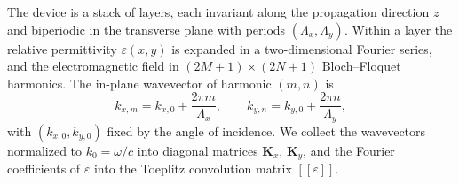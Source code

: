 \documentclass[preprint,12pt]{elsarticle}
\providecommand{\llbracket}{[\![}
\providecommand{\rrbracket}{]\!]}
\begin{document}
The device is a stack of layers, each invariant along the propagation direction
$z$ and biperiodic in the transverse plane with periods $(\Lambda_x,\Lambda_y)$.
Within a layer the relative permittivity $\varepsilon(x,y)$ is expanded in a
two-dimensional Fourier series, and the electromagnetic field in
$(2M{+}1)\times(2N{+}1)$ Bloch--Floquet harmonics. The in-plane wavevector of
harmonic $(m,n)$ is
\begin{equation}
k_{x,m} = k_{x,0} + \frac{2\pi m}{\Lambda_x}, \qquad
k_{y,n} = k_{y,0} + \frac{2\pi n}{\Lambda_y},
\end{equation}
with $(k_{x,0},k_{y,0})$ fixed by the angle of incidence. We collect the
wavevectors normalized to $k_0=\omega/c$ into diagonal matrices $\mathbf{K}_x$,
$\mathbf{K}_y$, and the Fourier coefficients of $\varepsilon$ into the Toeplitz
convolution matrix $\llbracket\varepsilon\rrbracket$.
\end{document}
